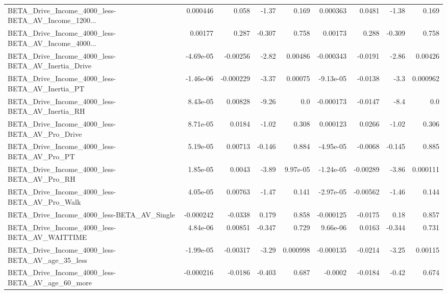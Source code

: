 \begin{tabular}{lrrrrrrrr}
BETA\_Drive\_Income\_4000\_less-BETA\_AV\_Income\_1200... &    0.000446 &        0.058 &    -1.37 &    0.169 &   0.000363 &      0.0481 &        -1.38 &         0.169 \\
BETA\_Drive\_Income\_4000\_less-BETA\_AV\_Income\_4000... &     0.00177 &        0.287 &   -0.307 &    0.758 &    0.00173 &       0.288 &       -0.309 &         0.758 \\
BETA\_Drive\_Income\_4000\_less-BETA\_AV\_Inertia\_Drive  &   -4.69e-05 &     -0.00256 &    -2.82 &  0.00486 &  -0.000343 &     -0.0191 &        -2.86 &       0.00426 \\
BETA\_Drive\_Income\_4000\_less-BETA\_AV\_Inertia\_PT     &   -1.46e-06 &    -0.000229 &    -3.37 &  0.00075 &  -9.13e-05 &     -0.0138 &         -3.3 &      0.000962 \\
BETA\_Drive\_Income\_4000\_less-BETA\_AV\_Inertia\_RH     &    8.43e-05 &      0.00828 &    -9.26 &      0.0 &  -0.000173 &     -0.0147 &         -8.4 &           0.0 \\
BETA\_Drive\_Income\_4000\_less-BETA\_AV\_Pro\_Drive      &    8.71e-05 &       0.0184 &    -1.02 &    0.308 &   0.000123 &      0.0266 &        -1.02 &         0.306 \\
BETA\_Drive\_Income\_4000\_less-BETA\_AV\_Pro\_PT         &    5.19e-05 &      0.00713 &   -0.146 &    0.884 &  -4.95e-05 &     -0.0068 &       -0.145 &         0.885 \\
BETA\_Drive\_Income\_4000\_less-BETA\_AV\_Pro\_RH         &    1.85e-05 &       0.0043 &    -3.89 & 9.97e-05 &  -1.24e-05 &    -0.00289 &        -3.86 &      0.000111 \\
BETA\_Drive\_Income\_4000\_less-BETA\_AV\_Pro\_Walk       &    4.05e-05 &      0.00763 &    -1.47 &    0.141 &  -2.97e-05 &    -0.00562 &        -1.46 &         0.144 \\
BETA\_Drive\_Income\_4000\_less-BETA\_AV\_Single         &   -0.000242 &      -0.0338 &    0.179 &    0.858 &  -0.000125 &     -0.0175 &         0.18 &         0.857 \\
BETA\_Drive\_Income\_4000\_less-BETA\_AV\_WAITTIME       &    4.84e-06 &      0.00851 &   -0.347 &    0.729 &   9.66e-06 &      0.0163 &       -0.344 &         0.731 \\
BETA\_Drive\_Income\_4000\_less-BETA\_AV\_age\_35\_less    &   -1.99e-05 &     -0.00317 &    -3.29 & 0.000998 &  -0.000135 &     -0.0214 &        -3.25 &       0.00115 \\
BETA\_Drive\_Income\_4000\_less-BETA\_AV\_age\_60\_more    &   -0.000216 &      -0.0186 &   -0.403 &    0.687 &    -0.0002 &     -0.0184 &        -0.42 &         0.674 \\

\end{tabular}
